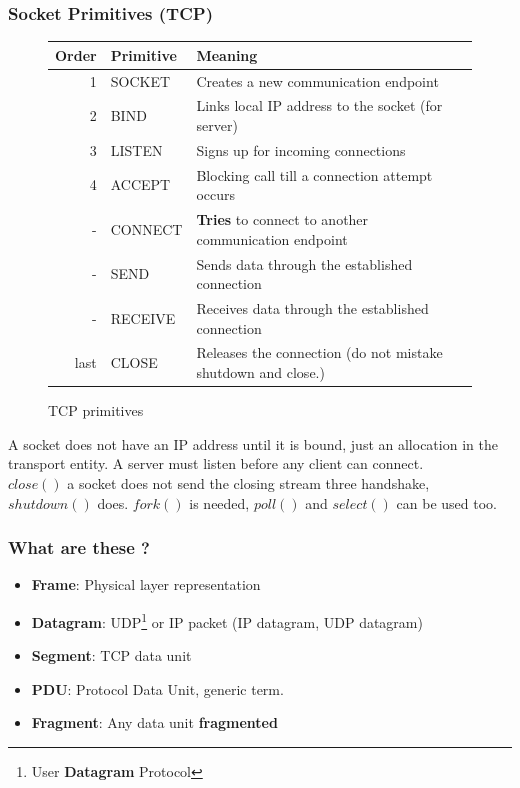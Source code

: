       \begin{frame}
        \frametitle{Socket Primitives (TCP)}
        \begin{figure}
          \centering
          \resizebox{10cm}{!} {
            \begin{tabular}{r|l|l}
              Order & Primitive & Meaning \\ \hline
              1     & SOCKET    & Creates a new communication endpoint \\ \hline
              2     & BIND      & Links local IP address to the socket (for server) \\ \hline
              3     & LISTEN    & Signs up for incoming connections \\ \hline
              4     & ACCEPT    & Blocking call till a connection attempt occurs \\ \hline
              -     & CONNECT   & \textbf{Tries} to connect to another communication endpoint \\ \hline
              -     & SEND      & Sends data through the established connection \\ \hline
              -     & RECEIVE   & Receives data through the established connection \\ \hline
              last  & CLOSE     & Releases the connection (do not mistake shutdown and close.) \\ \hline
            \end{tabular}
          }
          \caption{TCP primitives}
          \label{fig:primitives}
        \end{figure}
        A socket does not have an IP address until it is bound, just an allocation in the transport entity. A server must listen before any client can connect. \\
        $close()$ a socket does not send the closing stream three handshake, $shutdown()$ does. $fork()$ is needed, $poll()$ and $select()$ can be used too.
      \end{frame}

  \begin{frame}
    \frametitle{What are these  ?}
      \begin{itemize}
        \item \textbf{Frame}: Physical layer representation
        \item \textbf{Datagram}: UDP\footnote{User \textbf{Datagram} Protocol} or IP packet (IP datagram, UDP datagram)
        \item \textbf{Segment}: TCP data unit
        \item \textbf{PDU}: Protocol Data Unit, generic term.
        \item \textbf{Fragment}: Any data unit \textbf{fragmented}
      \end{itemize}
  \end{frame}
